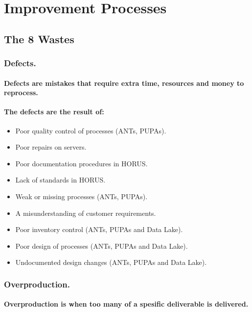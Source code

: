 \documentclass{acm_proc_article-sp}
\begin{document}
\section{Improvement Processes}
\subsection{The 8 Wastes}
\subsubsection{Defects.}
\paragraph{Defects are mistakes that require extra time, resources and money to reprocess.}
\paragraph{The defects are the result of:}
\begin{itemize}
\item Poor quality control of processes (ANTs, PUPAs).
\item Poor repairs on servers.
\item Poor documentation procedures in HORUS.
\item Lack of standards in HORUS.
\item Weak or missing processes (ANTs, PUPAs).
\item A misunderstanding of customer requirements.
\item Poor inventory control (ANTs, PUPAs and Data Lake).
\item Poor design of processes (ANTs, PUPAs and Data Lake).
\item Undocumented design changes (ANTs, PUPAs and Data Lake).
\end{itemize}
\subsubsection{Overproduction.}
\paragraph{Overproduction is when too many of a spesific deliverable is delivered.}
\end{document}
